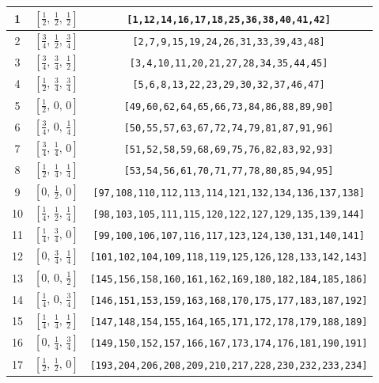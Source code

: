 \documentclass[fleqn,8pt]{jsarticle}
\begin{document}
\begin{longtable}{ccc}
1 & $\left[ \frac{1}{2},\, \frac{1}{2},\, \frac{1}{2} \right]$ & {\tt [1,12,14,16,17,18,25,36,38,40,41,42]} \\ \hline
2 & $\left[ \frac{3}{4},\, \frac{1}{2},\, \frac{3}{4} \right]$ & {\tt [2,7,9,15,19,24,26,31,33,39,43,48]} \\ \hline
3 & $\left[ \frac{3}{4},\, \frac{3}{4},\, \frac{1}{2} \right]$ & {\tt [3,4,10,11,20,21,27,28,34,35,44,45]} \\ \hline
4 & $\left[ \frac{1}{2},\, \frac{3}{4},\, \frac{3}{4} \right]$ & {\tt [5,6,8,13,22,23,29,30,32,37,46,47]} \\ \hline
5 & $\left[ \frac{1}{2},\, 0,\, 0 \right]$ & {\tt [49,60,62,64,65,66,73,84,86,88,89,90]} \\ \hline
6 & $\left[ \frac{3}{4},\, 0,\, \frac{1}{4} \right]$ & {\tt [50,55,57,63,67,72,74,79,81,87,91,96]} \\ \hline
7 & $\left[ \frac{3}{4},\, \frac{1}{4},\, 0 \right]$ & {\tt [51,52,58,59,68,69,75,76,82,83,92,93]} \\ \hline
8 & $\left[ \frac{1}{2},\, \frac{1}{4},\, \frac{1}{4} \right]$ & {\tt [53,54,56,61,70,71,77,78,80,85,94,95]} \\ \hline
9 & $\left[ 0,\, \frac{1}{2},\, 0 \right]$ & {\tt [97,108,110,112,113,114,121,132,134,136,137,138]} \\ \hline
10 & $\left[ \frac{1}{4},\, \frac{1}{2},\, \frac{1}{4} \right]$ & {\tt [98,103,105,111,115,120,122,127,129,135,139,144]} \\ \hline
11 & $\left[ \frac{1}{4},\, \frac{3}{4},\, 0 \right]$ & {\tt [99,100,106,107,116,117,123,124,130,131,140,141]} \\ \hline
12 & $\left[ 0,\, \frac{3}{4},\, \frac{1}{4} \right]$ & {\tt [101,102,104,109,118,119,125,126,128,133,142,143]} \\ \hline
13 & $\left[ 0,\, 0,\, \frac{1}{2} \right]$ & {\tt [145,156,158,160,161,162,169,180,182,184,185,186]} \\ \hline
14 & $\left[ \frac{1}{4},\, 0,\, \frac{3}{4} \right]$ & {\tt [146,151,153,159,163,168,170,175,177,183,187,192]} \\ \hline
15 & $\left[ \frac{1}{4},\, \frac{1}{4},\, \frac{1}{2} \right]$ & {\tt [147,148,154,155,164,165,171,172,178,179,188,189]} \\ \hline
16 & $\left[ 0,\, \frac{1}{4},\, \frac{3}{4} \right]$ & {\tt [149,150,152,157,166,167,173,174,176,181,190,191]} \\ \hline
17 & $\left[ \frac{1}{2},\, \frac{1}{2},\, 0 \right]$ & {\tt [193,204,206,208,209,210,217,228,230,232,233,234]} \\ \hline

\end{longtable}
\end{document}
